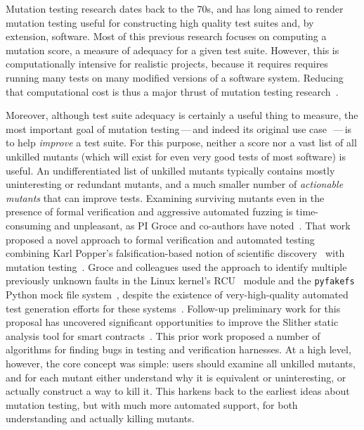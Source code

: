 Mutation testing research dates back to the 70s, and has long aimed to render
mutation testing useful for constructing high quality
test suites and, by extension, software.
Most of this previous
research focuses on computing a mutation score, a measure of adequacy for a
given test suite.  However, this is computationally intensive for realistic
projects, because it requires requires running many tests on many modified
versions of a software system.  Reducing that computational cost is thus a major
thrust of mutation testing research~\cite{jia2011analysis}.

Moreover, although test suite adequacy is certainly a useful thing to measure, the most
important goal of mutation testing\,---\,and indeed its original use
case~\cite{budd1980theoretical}\,---\,is to help \emph{improve} a test suite.  For this
purpose, neither a score nor a vast list of all unkilled mutants
(which will exist for even very good tests of most software) is useful.  An
undifferentiated list of unkilled mutants typically contains mostly uninteresting or
redundant mutants, and a much smaller number of \emph{actionable
  mutants} that can improve tests.  Examining
surviving mutants even in the presence of formal verification and
aggressive automated fuzzing  is
time-consuming and unpleasant, as PI Groce and co-authors have noted~\cite{groce2015verified,groce2018verified,mutKernel}.
%
That work proposed a novel approach to
formal verification and automated testing
combining Karl Popper's falsification-based notion of
scientific discovery~\cite{Popper,popperconjectures} with mutation
testing~\cite{groce2015verified,groce2018verified,mutKernel}.
Groce and colleagues used the
approach to identify multiple previously unknown faults in
the Linux kernel's
RCU~\cite{MathieuDesnoyers2012URCU,DinakarGuniguntala2008IBMSysJ,McKenney:2013:SDS:2483852.2483867}
module and the {\tt pyfakefs} Python mock file
system~\cite{pyfakefs}, despite the existence of very-high-quality
automated test generation efforts for these
systems~\cite{rcutorture,TSTL}.  Follow-up preliminary work for this
proposal has uncovered significant opportunities to improve the
Slither static analysis tool for smart
contracts~\cite{slitherpaper,slither-code}.  
This prior work
proposed a number of algorithms 
for finding bugs in testing and verification
harnesses.  At a high level, however,
the core concept was simple:  users should examine all unkilled
mutants, and for each mutant either understand why it is
equivalent or uninteresting, or actually construct a way to kill it.  This harkens back to the
earliest ideas about mutation testing, but with
much more automated support, for both understanding and actually killing
mutants. 

